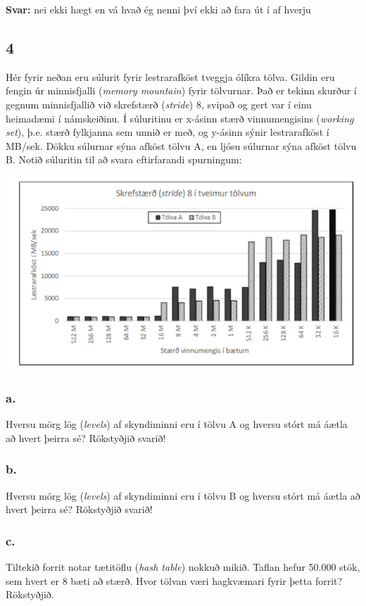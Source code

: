 \documentclass{article}
\begin{document}
\textbf{Svar:} nei ekki hægt en vá hvað ég nenni því ekki að fara út í af hverju

\newpage
\subsection{4} Hér fyrir neðan eru súlurit fyrir lestrarafköst tveggja ólíkra tölva. Gildin eru
fengin úr minnisfjalli (\textit{memory mountain}) fyrir tölvurnar. Það er tekinn skurður í
gegnum minnisfjallið við skrefstærð (\textit{stride}) 8, svipað og gert var í einu heimadæmi í
námskeiðinu. Í súluritinu er x-ásinn stærð vinnumengisins (\textit{working set}), þ.e. stærð
fylkjanna sem unnið er með, og y-ásinn sýnir lestrarafköst í MB/sek. Dökku súlurnar
sýna afköst tölvu A, en ljósu súlurnar sýna afköst tölvu B. Notið súluritin til að svara
eftirfarandi spurningum:


\includegraphics[scale = 0.7]{myndir/prof2021d4.png}


\subsubsection{a.}Hversu mörg lög (\textit{levels}) af skyndiminni eru í tölvu A og hversu stórt má áætla
að hvert þeirra sé? Rökstyðjið svarið!

\subsubsection{b.}Hversu mörg lög (\textit{levels}) af skyndiminni eru í tölvu B og hversu stórt má áætla
að hvert þeirra sé? Rökstyðjið svarið!

\subsubsection{c.}Tiltekið forrit notar tætitöflu (\textit{hash table}) nokkuð mikið. Taflan hefur 50.000
stök, sem hvert er 8 bæti að stærð. Hvor tölvan væri hagkvæmari fyrir þetta
forrit? Rökstyðjið.
\end{document}
